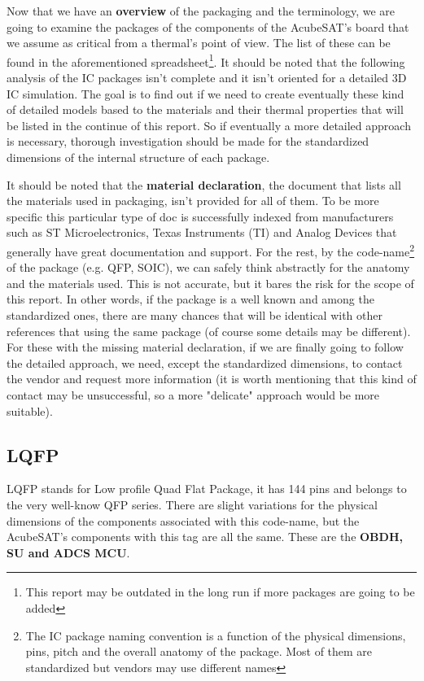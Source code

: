 \documentclass[final]{cubedoc}
\begin{document}
	
	Now that we have an \textbf{overview} of the packaging and the terminology, we are going to examine the packages of the components of the AcubeSAT's board that we assume as critical from a thermal's point of view. The list of these can be found in the aforementioned spreadsheet\footnote{This report may be outdated in the long run if more packages are going to be added}. It should be noted that the following analysis of the IC packages isn't complete and it isn't oriented for a detailed 3D IC simulation. The goal is to find out if we need to create eventually these kind of detailed models based to the materials and their thermal properties that will be listed in the continue of this report. So if eventually a more detailed approach  is necessary, thorough investigation should be made for the standardized dimensions of the internal structure of each package. 
	
	It should be noted that the \textbf{material declaration}, the document that lists all the materials used in packaging, isn't provided for all of them. To be more specific this particular type of doc is successfully indexed from manufacturers such as ST Microelectronics, Texas Instruments (TI) and Analog Devices that generally have great documentation and support. For the rest, by the code-name\footnote{The IC package naming convention is a function of the physical dimensions, pins, pitch and the overall anatomy of the package. Most of them are standardized but vendors may use different names} of the package (e.g. QFP, SOIC), we can safely think abstractly for the anatomy and the materials used. This is not accurate, but it bares the risk for the scope of this report. In other words, if the package is a well known and among the standardized ones, there are many chances that will be identical with other references that using the same package (of course some details may be different). For these with the missing material declaration, if we are finally going to follow the detailed approach, we need, except the standardized dimensions, to contact the vendor and request more information (it is worth mentioning that this kind of contact may be unsuccessful, so a more "delicate" approach would be more suitable). 
	
	
	\subsection{LQFP}
	
	
	LQFP stands for Low profile Quad Flat Package, it has 144 pins and belongs to the very well-know QFP series. There are slight variations for the physical dimensions of the components associated with this code-name, but the AcubeSAT's components with this tag are all the same. These are the \textbf{OBDH, SU and ADCS MCU}.
	
\end{document}
